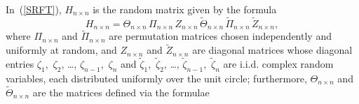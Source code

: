 \documentclass[letterpaper,12pt]{article}
\begin{document}
In~(\ref{SRFT}), $H_{n \times n}$ is the random matrix given by the formula
\begin{equation}
\label{Rokhlin_trans}
H_{n \times n} = \Theta_{n \times n} \, \Pi_{n \times n} \, Z_{n \times n}
              \, \tilde{\Theta}_{n \times n} \, \tilde{\Pi}_{n \times n}
              \, \tilde{Z}_{n \times n},
\end{equation}
where $\Pi_{n \times n}$ and $\tilde{\Pi}_{n \times n}$
are permutation matrices chosen independently and uniformly at random, and
$Z_{n \times n}$ and $\tilde{Z}_{n \times n}$ are diagonal matrices
whose diagonal entries $\zeta_1$,~$\zeta_2$, \dots, $\zeta_{n-1}$,~$\zeta_n$
and $\tilde{\zeta}_1$,~$\tilde{\zeta}_2$, \dots,
$\tilde{\zeta}_{n-1}$,~$\tilde{\zeta}_n$ are i.i.d. complex random variables,
each distributed uniformly over the unit circle; furthermore,
$\Theta_{n \times n}$ and $\tilde{\Theta}_{n \times n}$ are the matrices
defined via the formulae
\end{document}
